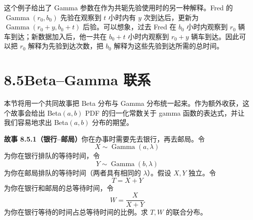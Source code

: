 \documentclass[UTF8, 12pt, fontset=fandol, oneside]{ctexart}
\begin{document}
这个例子给出了 Gamma 参数在作为共轭先验使用时的另一种解释。Fred 的 $\operatorname{Gamma}(r_0,b_0)$ 先验在观察到 $t$ 小时内有 $y$ 次到达后，更新为 $\operatorname{Gamma}(r_0+y,b_0+t)$ 后验。可以想象，过去 Fred 在 $b_0$ 小时内观察到 $r_0$ 辆车到达；新数据加入后，他一共在 $b_0+t$ 小时内观察到 $r_0+y$ 辆车到达。因此可以把 $r_0$ 解释为先验到达次数，把 $b_0$ 解释为这些先验到达所需的总时间。

\section*{8.5\quad Beta--Gamma 联系}

本节将用一个共同故事把 Beta 分布与 Gamma 分布统一起来。作为额外收获，这个故事会给出 Beta$(a,b)$ PDF 的归一化常数关于 gamma 函数的表达式，并让我们容易地求出 Beta$(a,b)$ 分布的期望。

\noindent\textbf{故事 8.5.1（银行--邮局）}\quad 你在办事时需要先去银行，再去邮局。令
\[
  X\sim\operatorname{Gamma}(a,\lambda)
\]
为你在银行排队的等待时间，令
\[
  Y\sim\operatorname{Gamma}(b,\lambda)
\]
为你在邮局排队的等待时间（两者具有相同的 $\lambda$）。假设 $X,Y$ 独立。令
\[
  T=X+Y
\]
为你在银行和邮局的总等待时间，令
\[
  W=\frac{X}{X+Y}
\]
为你在银行等待的时间占总等待时间的比例。求 $T,W$ 的联合分布。
\end{document}
